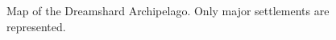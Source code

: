 \begin{figure}[ht!]
    \centering
    \caption{Map of the Dreamshard Archipelago. Only major settlements are represented.}
    \label{map_1}
\end{figure}


